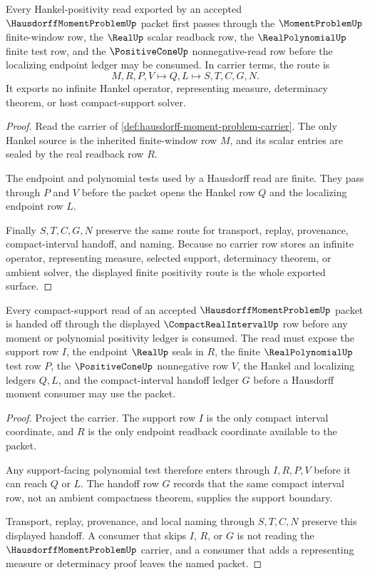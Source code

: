\begin{theorem}
\label{thm:hausdorff-moment-problem-hankel-positivity-route}
Every Hankel-positivity read exported by an accepted $\HausdorffMomentProblemUp$ packet first passes through the $\MomentProblemUp$ finite-window row, the $\RealUp$ scalar readback row, the $\RealPolynomialUp$ finite test row, and the $\PositiveConeUp$ nonnegative-read row before the localizing endpoint ledger may be consumed. In carrier terms, the route is
$$
M,R,P,V \longmapsto Q,L \longmapsto S,T,C,G,N .
$$
It exports no infinite Hankel operator, representing measure, determinacy theorem, or host compact-support solver.
\end{theorem}
\begin{proof}
Read the carrier of \autoref{def:hausdorff-moment-problem-carrier}. The only Hankel source is the inherited finite-window row $M$, and its scalar entries are sealed by the real readback row $R$.

The endpoint and polynomial tests used by a Hausdorff read are finite. They pass through $P$ and $V$ before the packet opens the Hankel row $Q$ and the localizing endpoint row $L$.

Finally $S,T,C,G,N$ preserve the same route for transport, replay, provenance, compact-interval handoff, and naming. Because no carrier row stores an infinite operator, representing measure, selected support, determinacy theorem, or ambient solver, the displayed finite positivity route is the whole exported surface.
\end{proof}

\begin{theorem}
\label{thm:hausdorff-moment-problem-compact-interval-handoff}
Every compact-support read of an accepted $\HausdorffMomentProblemUp$ packet is handed off through the displayed $\CompactRealIntervalUp$ row before any moment or polynomial positivity ledger is consumed. The read must expose the support row $I$, the endpoint $\RealUp$ seals in $R$, the finite $\RealPolynomialUp$ test row $P$, the $\PositiveConeUp$ nonnegative row $V$, the Hankel and localizing ledgers $Q,L$, and the compact-interval handoff ledger $G$ before a Hausdorff moment consumer may use the packet.
\end{theorem}
\begin{proof}
Project the carrier. The support row $I$ is the only compact interval coordinate, and $R$ is the only endpoint readback coordinate available to the packet.

Any support-facing polynomial test therefore enters through $I,R,P,V$ before it can reach $Q$ or $L$. The handoff row $G$ records that the same compact interval row, not an ambient compactness theorem, supplies the support boundary.

Transport, replay, provenance, and local naming through $S,T,C,N$ preserve this displayed handoff. A consumer that skips $I$, $R$, or $G$ is not reading the $\HausdorffMomentProblemUp$ carrier, and a consumer that adds a representing measure or determinacy proof leaves the named packet.
\end{proof}

